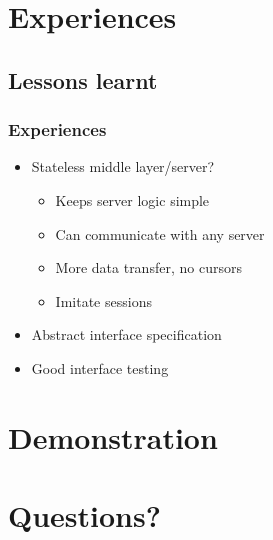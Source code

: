 \documentclass{beamer}
\begin{document}
\section{Experiences}
\subsection{Lessons learnt}
\begin{frame}
	\frametitle{Experiences}
	\begin{itemize}
		\item Stateless middle layer/server?
			\begin{itemize}
				\item Keeps server logic simple
				\item Can communicate with any server
				\item More data transfer, no cursors
				\item Imitate sessions
			\end{itemize}
		\item Abstract interface specification
		\item Good interface testing
	\end{itemize}
\end{frame}

\section{Demonstration}

\section{Questions?}
\end{document}
